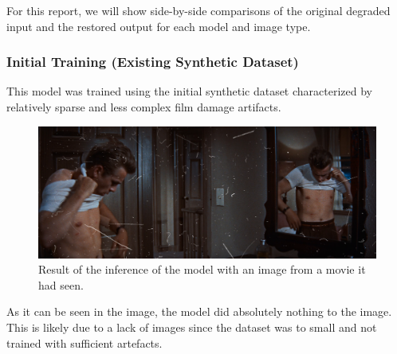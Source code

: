 \documentclass[openany, 12pt]{article}
\begin{document}
For this report, we will show side-by-side comparisons of the original degraded input and the restored output for each model and image type.\\

\subsubsection*{Initial Training (Existing Synthetic Dataset)}
This model was trained using the initial synthetic dataset characterized by relatively sparse and less complex film damage artifacts.
    	\begin{figure}[h!]
	\centering
	\includegraphics[width=0.8\linewidth]{./images/rebel_bad.png}
	\caption{\smaller Result of the inference of the model with an image from a movie it had seen.} 
\end{figure}
As it can be seen in the image, the model did absolutely nothing to the image. This is likely due to a lack of images since the dataset was to small and not trained with sufficient artefacts. 
\end{document}
